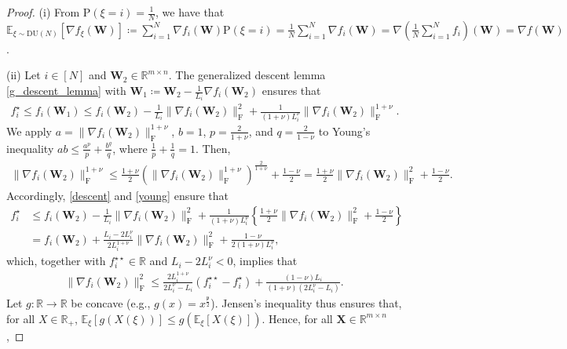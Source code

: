 \documentclass[twoside,11pt]{article}
\begin{document}
\begin{proof}
(i) From $\mathrm{P}(\xi = i) = \frac{1}{N}$, we have that $\mathbb{E}_{\xi \sim \mathrm{DU}(N)}[\nabla f_\xi (\bm{W})] \coloneqq \sum_{i=1}^N \nabla f_i (\bm{W}) \mathrm{P}(\xi = i) = \frac{1}{N} \sum_{i=1}^N \nabla f_i (\bm{W}) = \nabla (\frac{1}{N} \sum_{i=1}^N f_i) (\bm{W}) = \nabla f (\bm{W})$.

(ii) Let $i\in [N]$ and $\bm{W}_2 \in \mathbb{R}^{m \times n}$. The generalized descent lemma \eqref{g_descent_lemma} with $\bm{W}_1 \coloneqq \bm{W}_2 - \frac{1}{L_i} \nabla f_i (\bm{W}_2)$ ensures that
\begin{align}\label{descent}
f_i^\star \leq f_i(\bm{W}_1) 
\leq f_i(\bm{W}_2) - \frac{1}{L_i} \| \nabla f_i (\bm{W}_2) \|_{\mathrm{F}}^2
+ \frac{1}{(1 + \nu) L_i^{\nu}} \| \nabla f_i (\bm{W}_2) \|_{\mathrm{F}}^{1 + \nu}.
\end{align}
We apply $a = \| \nabla f_i (\bm{W}_2) \|_{\mathrm{F}}^{1 + \nu}$, $b = 1$, $p = \frac{2}{1 + \nu}$, and $q = \frac{2}{1 - \nu}$ to Young's inequality $ab \leq \frac{a^p}{p} + \frac{b^q}{q}$, where $\frac{1}{p} + \frac{1}{q} = 1$. Then,
\begin{align}\label{young}
\| \nabla f_i (\bm{W}_2) \|_{\mathrm{F}}^{1 + \nu}
\leq 
\frac{1 + \nu}{2} \left( \| \nabla f_i (\bm{W}_2) \|_{\mathrm{F}}^{1 + \nu}  \right)^{\frac{2}{1 + \nu}}
+ \frac{1 - \nu}{2}
= 
\frac{1 + \nu}{2} \| \nabla f_i (\bm{W}_2) \|_{\mathrm{F}}^{2} 
+ \frac{1 - \nu}{2}.
\end{align}
Accordingly, \eqref{descent} and \eqref{young} ensure that 
\begin{align*}
f_i^\star 
&\leq f_i(\bm{W}_2) - \frac{1}{L_i} \| \nabla f_i (\bm{W}_2) \|_{\mathrm{F}}^2
+ \frac{1}{(1 + \nu) L_i^{\nu}} 
\left\{  
\frac{1 + \nu}{2} \| \nabla f_i (\bm{W}_2) \|_{\mathrm{F}}^{2} 
+ \frac{1 - \nu}{2}
\right\}\\
&= f_i(\bm{W}_2) + \frac{L_i - 2 L_i^\nu}{2 L_i^{1 + \nu}} \| \nabla f_i (\bm{W}_2) \|_{\mathrm{F}}^{2} 
+ \frac{1 - \nu}{2 (1 + \nu) L_i^\nu},
\end{align*}
which, together with $f_i^{\star\star} \in \mathbb{R}$ and $L_i - 2 L_i^\nu < 0$, implies that
\begin{align}\label{norm_nabla_f_i}
\| \nabla f_i (\bm{W}_2) \|_{\mathrm{F}}^{2}
\leq
\frac{2 L_i^{1 + \nu}}{2 L_i^\nu - L_i} (f_i^{\star\star} - f_i^{\star})
+ 
\frac{(1 - \nu) L_i}{(1 + \nu)(2 L_i^\nu - L_i)}.
\end{align}
Let $g \colon \mathbb{R} \to \mathbb{R}$ be concave (e.g., $g(x) = x^{\frac{\mathfrak{p}}{2}}$). Jensen's inequality thus ensures that, for all $X \in \mathbb{R}_+$, $\mathbb{E}_\xi [g(X(\xi))] \leq g (\mathbb{E}_\xi [X(\xi)])$. Hence, for all $\bm{X} \in \mathbb{R}^{m \times n}$,

\end{proof}
\end{document}
